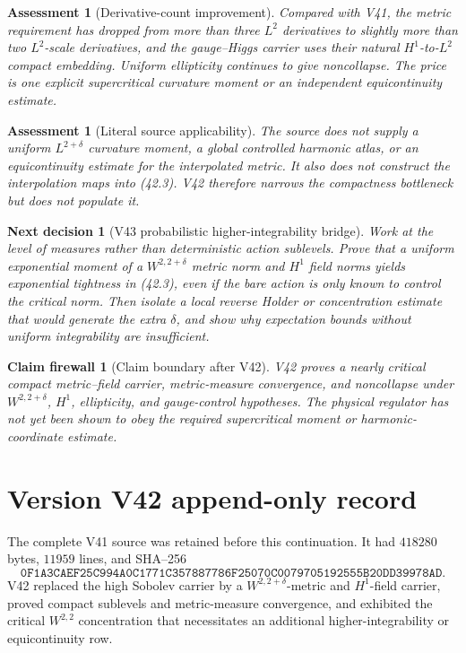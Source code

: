 \documentclass[11pt]{article}
\newtheorem{firewall}[theorem]{Claim firewall}
\newtheorem{decision}[theorem]{Next decision}
\newtheorem{assessment}[theorem]{Assessment}
\theoremstyle{remark}
\begin{document}
\begin{assessment}[Derivative-count improvement]
\label{ass:v15v42-improvement}
Compared with V41, the metric requirement has dropped from more than
three \(L^2\) derivatives to slightly more than two \(L^2\)-scale
derivatives, and the gauge--Higgs carrier uses their natural
\(H^1\)-to-\(L^2\) compact embedding.  Uniform ellipticity continues
to give noncollapse.  The price is one explicit supercritical
curvature moment or an independent equicontinuity estimate.
\end{assessment}

\begin{assessment}[Literal source applicability]
\label{ass:v15v42-source}
The source does not supply a uniform \(L^{2+\delta}\) curvature
moment, a global controlled harmonic atlas, or an equicontinuity
estimate for the interpolated metric.  It also does not construct
the interpolation maps into (42.3).  V42 therefore narrows the
compactness bottleneck but does not populate it.
\end{assessment}

\begin{decision}[V43 probabilistic higher-integrability bridge]
\label{dec:v15v42-next}
Work at the level of measures rather than deterministic action
sublevels.  Prove that a uniform exponential moment of a
\(W^{2,2+\delta}\) metric norm and \(H^1\) field norms yields
exponential tightness in (42.3), even if the bare action is only
known to control the critical norm.  Then isolate a local reverse
Holder or concentration estimate that would generate the extra
\(\delta\), and show why expectation bounds without uniform
integrability are insufficient.
\end{decision}

\begin{firewall}[Claim boundary after V42]
\label{fire:v15v42}
V42 proves a nearly critical compact metric--field carrier,
metric-measure convergence, and noncollapse under
\(W^{2,2+\delta}\), \(H^1\), ellipticity, and gauge-control
hypotheses.  The physical regulator has not yet been shown to obey
the required supercritical moment or harmonic-coordinate estimate.
\end{firewall}

\section*{Version V42 append-only record}
The complete V41 source was retained before this continuation.  It
had \(418280\) bytes, \(11959\) lines, and SHA--256
\[
 \texttt{0F1A3CAEF25C994A0C1771C357887786F25070C0079705192555B20DD39978AD}.
\]
V42 replaced the high Sobolev carrier by a
\(W^{2,2+\delta}\)-metric and \(H^1\)-field carrier, proved compact
sublevels and metric-measure convergence, and exhibited the critical
\(W^{2,2}\) concentration that necessitates an additional
higher-integrability or equicontinuity row.
\end{document}
